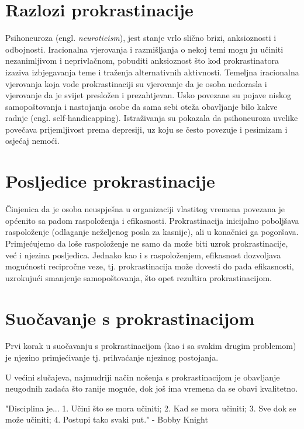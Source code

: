 \section{Razlozi prokrastinacije}
Psihoneuroza (engl. \emph{neuroticism}), jest stanje vrlo slično brizi,
anksioznosti i odbojnosti. Iracionalna vjerovanja i razmišljanja o nekoj temi
mogu ju učiniti nezanimljivom i neprivlačnom, pobuditi anksioznost što kod
prokrastinatora izaziva izbjegavanja teme i traženja alternativnih aktivnosti.
Temeljna iracionalna vjerovanja koja vode prokrastinaciji su vjerovanje da je
osoba nedorasla i vjerovanje da je svijet presložen i prezahtjevan. Usko
povezane su pojave niskog samopoštovanja i nastojanja osobe da sama sebi oteža
obavljanje bilo kakve radnje (engl. self-handicapping). Istraživanja
\cite{Caballero95neuro,Saklofske95neuro} su pokazala da psihoneuroza uvelike
povečava prijemljivost prema depresiji, uz koju se često povezuje i pesimizam i
osjećaj nemoći.

\section{Posljedice prokrastinacije}
Činjenica da je osoba neuspješna u organizaciji vlastitog vremena povezana je
općenito sa padom raspoloženja i efikasnosti. Prokrastinacija inicijalno
poboljšava raspoloženje (odlaganje neželjenog posla za kasnije), ali u
konačnici ga pogoršava. Primjećujemo da loše raspoloženje ne samo da može biti
uzrok prokrastinacije, već i njezina posljedica. Jednako kao i s raspoloženjem,
efikasnost dozvoljava mogućnosti recipročne veze, tj. prokrastinacija može
dovesti do pada efikasnosti, uzrokujući smanjenje samopoštovanja, što opet
rezultira prokrastinacijom.

\section{Suočavanje s prokrastinacijom}
Prvi korak u suočavanju s prokrastinacijom (kao i sa svakim drugim problemom)
je njezino primjećivanje tj. prihvaćanje njezinog postojanja. 

U većini slučajeva, najmudriji način nošenja s prokrastinacijom je obavljanje
neugodnih zadaća što ranije moguće, dok još ima vremena da se obavi kvalitetno.

"Disciplina je... 1. Učini što se mora učiniti; 2. Kad se mora učiniti; 3. Sve
dok se može učiniti; 4. Postupi tako svaki put." - Bobby Knight  

